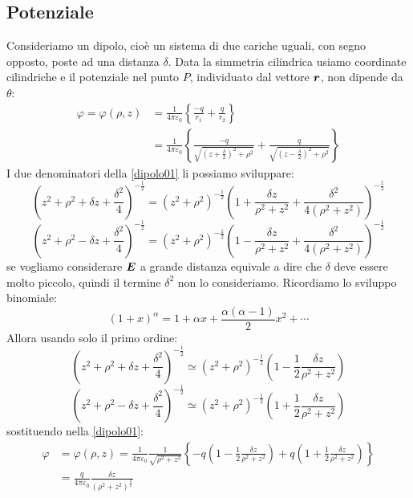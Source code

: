 \subsection{Potenziale}
Consideriamo un dipolo, cioè un sistema di due cariche uguali, con segno opposto, poste ad una distanza $\delta$. Data la simmetria cilindrica usiamo coordinate cilindriche e il potenziale nel punto $P$, individuato dal vettore $\boldsymbol{r}$, non dipende da $\theta$:
\begin{align}
\varphi=\varphi(\rho,z)&=\frac{1}{4\pi\varepsilon_0}\left\{\frac{-q}{r_1}+\frac{q}{r_2}\right\}\\
&=\frac{1}{4\pi\varepsilon_0}\left\{\frac{-q}{\sqrt{\left(z+\frac{\delta}{2}\right)^2+\rho^2}}+\frac{q}{\sqrt{\left(z-\frac{\delta}{2}\right)^2+\rho^2}}\right\}
\label{dipolo01}
\end{align}
I due denominatori della \eqref{dipolo01} li possiamo sviluppare:
\begin{equation*}\left(z^2+\rho^2+\delta z+\frac{\delta^2}{4}\right)^{-\frac{1}{2}}=\left(z^2+\rho^2\right)^{-\frac{1}{2}}\left(1+\frac{\delta z}{\rho^2+z^2}+\frac{\delta^2}{4\left(\rho^2+z^2\right)}\right)^{-\frac{1}{2}}\end{equation*}
\begin{equation*}\left(z^2+\rho^2-\delta z+\frac{\delta ^2}{4}\right)^{-\frac{1}{2}}=\left(z^2+\rho^2\right)^{-\frac{1}{2}}\left(1-\frac{\delta z}{\rho^2+z^2}+\frac{\delta^2}{4\left(\rho^2+z^2\right)}\right)^{-\frac{1}{2}}\end{equation*}
se vogliamo considerare $\boldsymbol{E}$ a grande distanza equivale a dire che $\delta$ deve essere molto piccolo, quindi il termine $\delta^2$ non lo consideriamo. Ricordiamo lo sviluppo binomiale:
\begin{equation*}\left(1+x\right)^\alpha=1+\alpha x+\frac{\alpha\left(\alpha-1\right)}{2}x^2+\cdots\end{equation*}
Allora usando solo il primo ordine:
\begin{equation*}\left(z^2+\rho^2+\delta z+\frac{\delta^2}{4}\right)^{-\frac{1}{2}}\simeq\left(z^2+\rho^2\right)^{-\frac{1}{2}}\left(1-\frac{1}{2}\frac{\delta z}{\rho^2+z^2}\right)\end{equation*}
\begin{equation*}\left(z^2+\rho^2-\delta z+\frac{\delta^2}{4}\right)^{-\frac{1}{2}}\simeq\left(z^2+\rho^2\right)^{-\frac{1}{2}}\left(1+\frac{1}{2}\frac{\delta z}{\rho^2+z^2}\right)\end{equation*}
sostituendo nella \eqref{dipolo01}:
\begin{align*}
\varphi&=\varphi(\rho,z)=\frac{1}{4\pi\varepsilon_0}\frac{1}{\sqrt{\rho^2+z^2}}\left\{-q\left(1-\frac{1}{2}\frac{\delta z}{\rho^2+z^2}\right)+q\left(1+\frac{1}{2}\frac{\delta z}{\rho^2+z^2}\right)\right\}\\
&=\frac{q}{4\pi\varepsilon_0}\frac{\delta z}{\left(\rho^2+z^2\right)^\frac{3}{2}}
\end{align*}
